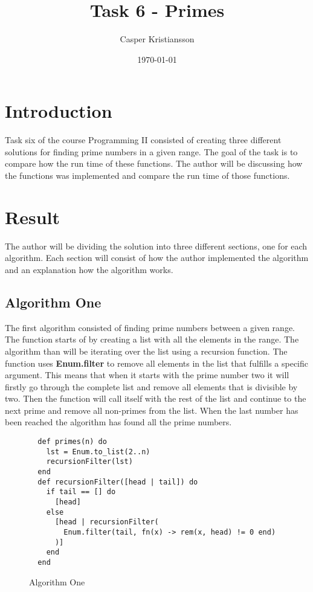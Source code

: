\documentclass[a4paper,11pt]{article}
\begin{document}
\title{
    \textbf{Task 6 - Primes}
}
\author{Casper Kristiansson}
\date{\today}

\maketitle

\section*{Introduction}
Task six of the course Programming II consisted of creating three different solutions for finding prime numbers in a given range. The goal of the task is to compare how the run time of these functions. The author will be discussing how the functions was implemented and compare the run time of those functions.

\section*{Result}
The author will be dividing the solution into three different sections, one for each algorithm. Each section will consist of how the author implemented the algorithm and an explanation how the algorithm works.

\subsection*{Algorithm One}
The first algorithm consisted of finding prime numbers between a given range. The function starts of by creating a list with all the elements in the range. The algorithm than will be iterating over the list using a recursion function. The function uses \textbf{Enum.filter} to remove all elements in the list that fulfills a specific argument. This means that when it starts with the prime number two it will firstly go through the complete list and remove all elements that is divisible by two. Then the function will call itself with the rest of the list and continue to the next prime and remove all non-primes from the list. When the last number has been reached the algorithm has found all the prime numbers.

\begin{figure}[H]
\begin{verbatim}
  def primes(n) do
    lst = Enum.to_list(2..n)
    recursionFilter(lst)
  end
  def recursionFilter([head | tail]) do
    if tail == [] do
      [head]
    else
      [head | recursionFilter(
        Enum.filter(tail, fn(x) -> rem(x, head) != 0 end)
      )]
    end
  end
\end{verbatim}
\caption{Algorithm One}
\label{Figure:1}
\end{figure}
\end{document}
